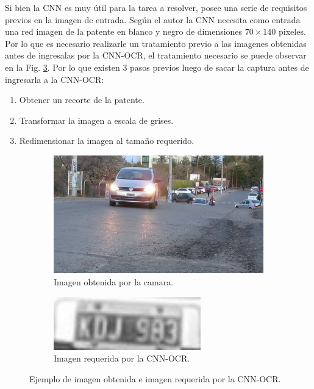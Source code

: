 Si bien la CNN es muy útil para la tarea a resolver, posee una serie de requisitos previos en la imagen de entrada.
Según el autor la CNN necesita como entrada una red imagen de la patente en blanco y negro de dimensiones $70 \times 140$ pixeles.
Por lo que es necesario realizarle un tratamiento previo a las imagenes obtenidas antes de ingresalas por la CNN-OCR, el tratamiento necesario se puede observar en la Fig. \ref{fig:Comparativa-imagenes}. Por lo que existen 3 pasos previos luego de sacar la captura antes de ingresarla a la CNN-OCR:

\begin{enumerate}
    \item Obtener un recorte de la patente.
    \item Transformar la imagen a escala de grises.
    \item Redimensionar la imagen al tamaño requerido.
\end{enumerate}
\begin{figure}[!tbp]
    \centering
    \begin{subfigure}[b]{0.49\textwidth}
        \centering
        \includegraphics[width=\textwidth]{imgs/imagen-obtenida.jpg}
        \caption{Imagen obtenida por la camara.}
        \label{fig:imagen-obtenida}
    \end{subfigure}
    \hfill
    \begin{subfigure}[b]{0.49\textwidth}
        \centering
        \includegraphics[width=0.7\textwidth]{imgs/imagen-requerida.jpg}
        \caption{Imagen requerida por la CNN-OCR.}
        \label{fig:imagen-requerida}
    \end{subfigure}
    \caption{Ejemplo de imagen obtenida e imagen requerida por la CNN-OCR.}
    \label{fig:Comparativa-imagenes}
\end{figure}

